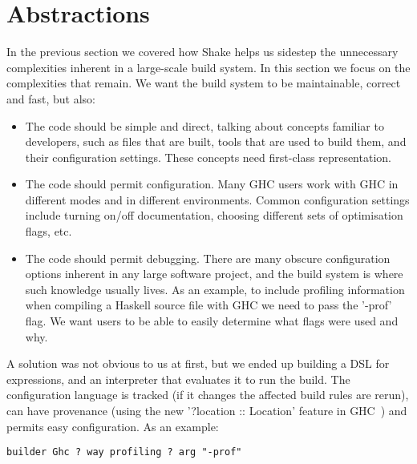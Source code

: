 \section{Abstractions\label{sec:abstractions}}


In the previous section we covered how Shake helps us sidestep the unnecessary
complexities inherent in a large-scale build system. In this section we focus on
the complexities that remain. We want the build system to be maintainable, correct
and fast, but also:

\begin{itemize}
\item The code should be simple and direct, talking about concepts familiar to
developers, such as files that are built, tools that are used to build
them, and their configuration settings. These concepts need first-class
representation.
\item The code should permit configuration. Many GHC users work with GHC in
different modes and in different environments. Common configuration settings
include turning on/off documentation, choosing different sets of optimisation flags,
etc.
\item The code should permit debugging. There are many obscure configuration
options inherent in any large software project, and the build system is where
such knowledge usually lives. As an example, to include profiling information
when compiling a Haskell source file with GHC we need to pass the \lst'-prof' flag.
We want users to be able to easily determine what flags were used and why.
\end{itemize}

A solution was not obvious to us at first, but we ended up building a DSL for
expressions, and an interpreter that evaluates it to run the build.
The configuration language is tracked (if it changes the affected build rules
are rerun), can have provenance (using the new \lst'?location :: Location' feature in
GHC~) and permits easy configuration. As an example:

\begin{lstlisting}
builder Ghc ? way profiling ? arg "-prof"
\end{lstlisting}

